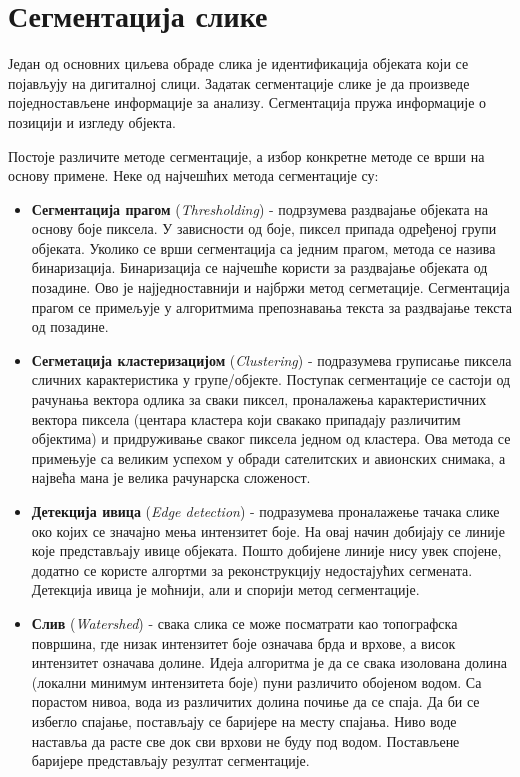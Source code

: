 \documentclass[11pt,a4paper,serbian,oneside]{book}
\begin{document}
\newpage

\section{Сегментација слике}

Један од основних циљева обраде слика је идентификација објеката који се појављују на дигиталној слици. Задатак сегментације слике је да произведе поједностављене информације за анализу. Сегментација пружа информације о позицији и изгледу објекта.

Постоје различите методе сегментације, а избор конкретне методе се врши на основу примене. Неке од најчешћих метода сегментације су:

\begin{itemize}

  \item \textbf{Сегментација прагом} (\textit{Thresholding}) - подрзумева раздвајање објеката на основу боје пиксела. У зависности од боје, пиксел припада одређеној групи објеката. Уколико се врши сегментација са једним прагом, метода се назива бинаризација. Бинаризација се најчешће користи за раздвајање објеката од позадине. Ово је најједноставнији и најбржи метод сегметације. Сегментација прагом се примељује у алгоритмима препознавања текста за раздвајање текста од позадине.

  \item \textbf{Сегметација кластеризацијом} (\textit{Clustering}) - подразумева груписање пиксела сличних карактеристика у групе/објекте. Поступак сегментације се састоји од рачунања вектора одлика за сваки пиксел, проналажења карактеристичних вектора пиксела (центара кластера који свакако припадају различитим објектима) и придруживање сваког пиксела једном од кластера. Ова метода се примењује са великим успехом у обради сателитских и авионских снимака, а највећа мана је велика рачунарска сложеност.
  
  \item \textbf{Детекција ивица} (\textit{Edge detection}) - подразумева проналажење тачака слике око којих се значајно мења интензитет боје. На овај начин добијају се линије које представљају ивице објеката. Пошто добијене линије нису увек спојене, додатно се користе алгортми за реконструкцију недостајућих сегмената. Детекција ивица је моћнији, али и спорији метод сегментације.
  
  \item \textbf{Слив} (\textit{Watershed}) - свака слика се може посматрати као топографска површина, где низак интензитет боје означава брда и врхове, а висок интензитет означава долине. Идеја алгоритма је да се свака изолована долина  (локални минимум интензитета боје) пуни различито обојеном водом. Са порастом нивоа, вода из различитих долина почиње да се спаја. Да би се избегло спајање, постављају се баријере на месту спајања.  Ниво воде наставља да расте све док сви врхови не буду под водом. Постављене баријере представљају резултат сегментације.

\end{itemize}
 
\end{document}
